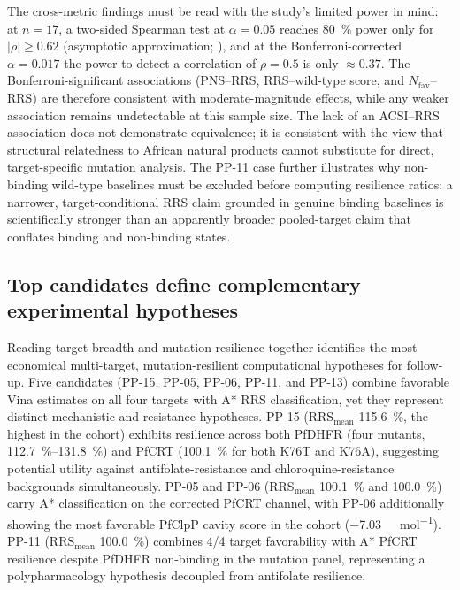 \documentclass[journal=jcisd8,manuscript=article]{achemso}
\begin{document}
The cross-metric findings must be read with the study's limited power in mind: at $n=\num{17}$, a two-sided Spearman test at $\alpha=\num{0.05}$ reaches \qty{80}{\percent} power only for $|\rho|\geq\num{0.62}$ (asymptotic approximation; ), and at the Bonferroni-corrected $\alpha=\num{0.017}$ the power to detect a correlation of $\rho=\num{0.5}$ is only $\approx\num{0.37}$. The Bonferroni-significant associations (PNS--RRS, RRS--wild-type score, and $N_{\mathrm{fav}}$--RRS) are therefore consistent with moderate-magnitude effects, while any weaker association remains undetectable at this sample size. The lack of an ACSI--RRS association does not demonstrate equivalence; it is consistent with the view that structural relatedness to African natural products cannot substitute for direct, target-specific mutation analysis. The PP-11 case further illustrates why non-binding wild-type baselines must be excluded before computing resilience ratios: a narrower, target-conditional RRS claim grounded in genuine binding baselines is scientifically stronger than an apparently broader pooled-target claim that conflates binding and non-binding states.

\subsection{Top candidates define complementary experimental hypotheses}\label{sec:disc_top}
Reading target breadth and mutation resilience together identifies the most economical multi-target, mutation-resilient computational hypotheses for follow-up. Five candidates (PP-15, PP-05, PP-06, PP-11, and PP-13) combine favorable Vina estimates on all four targets with A* RRS classification, yet they represent distinct mechanistic and resistance hypotheses. PP-15 (RRS$_{\mathrm{mean}}$ \qty{115.6}{\percent}, the highest in the cohort) exhibits resilience across both PfDHFR (four mutants, \qtyrange{112.7}{131.8}{\percent}) and PfCRT (\qty{100.1}{\percent} for both K76T and K76A), suggesting potential utility against antifolate-resistance and chloroquine-resistance backgrounds simultaneously. PP-05 and PP-06 (RRS$_{\mathrm{mean}}$ \qty{100.1}{\percent} and \qty{100.0}{\percent}) carry A* classification on the corrected PfCRT channel, with PP-06 additionally showing the most favorable PfClpP cavity score in the cohort (\qty{-7.03}{\kilo\calorie\per\mole}). PP-11 (RRS$_{\mathrm{mean}}$ \qty{100.0}{\percent}) combines \num{4}/\num{4} target favorability with A* PfCRT resilience despite PfDHFR non-binding in the mutation panel, representing a polypharmacology hypothesis decoupled from antifolate resilience.
\end{document}
